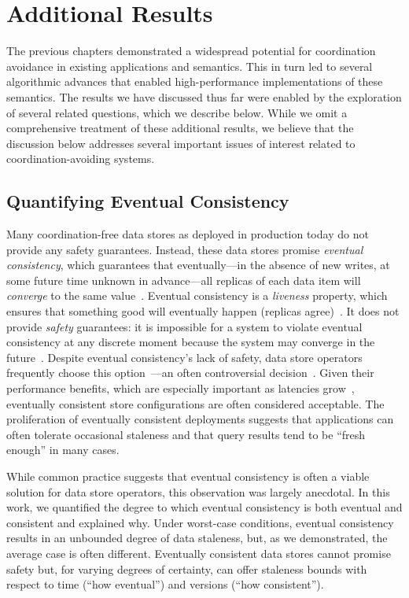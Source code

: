 
\chapter{Additional Results}
\label{c.discussion}

The previous chapters demonstrated a widespread potential for
coordination avoidance in existing applications and semantics. This in
turn led to several algorithmic advances that enabled high-performance
implementations of these semantics.  The results we have discussed
thus far were enabled by the exploration of several related questions,
which we describe below. While we omit a comprehensive treatment of
these additional results, we believe that the discussion below
addresses several important issues of interest related to
coordination-avoiding systems.


\section{Quantifying Eventual Consistency} 

Many coordination-free data stores as deployed in production today do
not provide any safety guarantees. Instead, these data stores promise
\textit{eventual consistency}, which guarantees that eventually---in
the absence of new writes, at some future time unknown in
advance---all replicas of each data item will {\em converge} to the
same value~\cite{vogels-defs}. Eventual consistency is a {\em
  liveness} property, which ensures that something good will
eventually happen (replicas agree)~\cite{liveness}. It does not
provide {\em safety} guarantees: it is impossible for a system to
violate eventual consistency at any discrete moment because the system
may converge in the future~\cite{queue}. Despite eventual
consistency's lack of safety, data store operators frequently choose
this
option~\cite{cassandra-docs,cassandradefault,feinbergpc,reddit,outbrain,maxperfblog}---an often controversial
decision~\cite{hamilton-cap,cops,walter,urbanmyths}.  Given their
performance benefits, which are especially important as latencies
grow~\cite{pacelc,feinbergpc,hamilton-cap,helland},
eventually consistent store configurations are often considered
acceptable.  The proliferation of eventually consistent deployments
suggests that applications can often tolerate occasional staleness and
that query results tend to be ``fresh enough'' in many cases.

While common practice suggests that eventual consistency is often a
viable solution for data store operators, this observation was largely
anecdotal. In this work, we quantified the degree to which eventual
consistency is both eventual and consistent and explained why. Under
worst-case conditions, eventual consistency results in an unbounded
degree of data staleness, but, as we demonstrated, the average case is
often different.  Eventually consistent data stores cannot promise
safety but, for varying degrees of certainty, can offer staleness
bounds with respect to time (``how eventual'') and versions (``how
consistent'').

